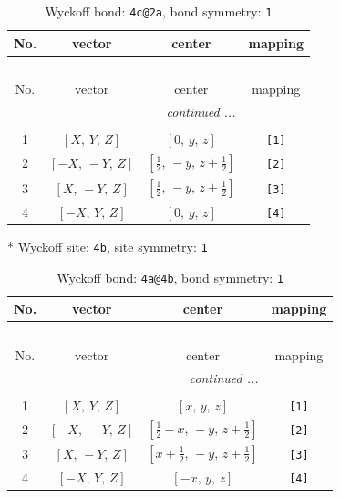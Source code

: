 \documentclass[fleqn,8pt]{jsarticle}
\begin{document}
\renewcommand{\arraystretch}{1.2}
\begin{longtable}{cccc}
\caption{Wyckoff bond: {\tt 4c@2a}, bond symmetry: {\tt 1}}
 \\
 \hline \hline
No. & vector & center & mapping \\ \hline \endfirsthead

\multicolumn{3}{l}{\tablename\ \thetable{}} \\
 \hline \hline
No. & vector & center & mapping \\ \hline \endhead

 \hline \hline
\multicolumn{3}{r}{\footnotesize\it continued ...} \\ \endfoot

 \hline \hline
\multicolumn{3}{r}{} \\ \endlastfoot

1 & $\left[ X,\, Y,\, Z \right]$ & $\left[ 0,\, y,\, z \right]$ & {\tt [1]} \\ \hline
2 & $\left[ - X,\, - Y,\, Z \right]$ & $\left[ \frac{1}{2},\, - y,\, z + \frac{1}{2} \right]$ & {\tt [2]} \\ \hline
3 & $\left[ X,\, - Y,\, Z \right]$ & $\left[ \frac{1}{2},\, - y,\, z + \frac{1}{2} \right]$ & {\tt [3]} \\ \hline
4 & $\left[ - X,\, Y,\, Z \right]$ & $\left[ 0,\, y,\, z \right]$ & {\tt [4]} \\
\end{longtable}
* Wyckoff site: {\tt 4b}, site symmetry: {\tt 1}
\renewcommand{\arraystretch}{1.2}
\begin{longtable}{cccc}
\caption{Wyckoff bond: {\tt 4a@4b}, bond symmetry: {\tt 1}}
 \\
 \hline \hline
No. & vector & center & mapping \\ \hline \endfirsthead

\multicolumn{3}{l}{\tablename\ \thetable{}} \\
 \hline \hline
No. & vector & center & mapping \\ \hline \endhead

 \hline \hline
\multicolumn{3}{r}{\footnotesize\it continued ...} \\ \endfoot

 \hline \hline
\multicolumn{3}{r}{} \\ \endlastfoot

1 & $\left[ X,\, Y,\, Z \right]$ & $\left[ x,\, y,\, z \right]$ & {\tt [1]} \\ \hline
2 & $\left[ - X,\, - Y,\, Z \right]$ & $\left[ \frac{1}{2} - x,\, - y,\, z + \frac{1}{2} \right]$ & {\tt [2]} \\ \hline
3 & $\left[ X,\, - Y,\, Z \right]$ & $\left[ x + \frac{1}{2},\, - y,\, z + \frac{1}{2} \right]$ & {\tt [3]} \\ \hline
4 & $\left[ - X,\, Y,\, Z \right]$ & $\left[ - x,\, y,\, z \right]$ & {\tt [4]} \\
\end{longtable}
\end{document}
